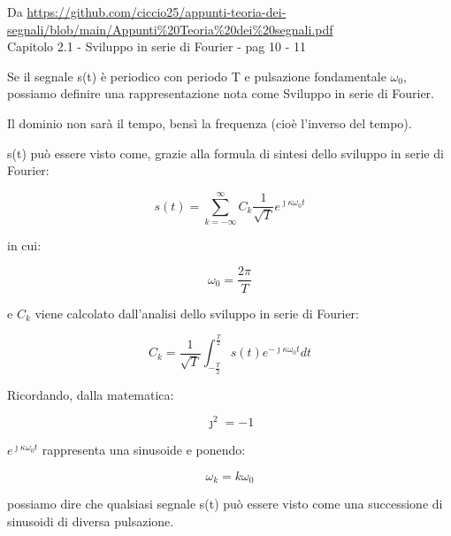 \begin{tcolorbox}
    Da \url{https://github.com/ciccio25/appunti-teoria-dei-segnali/blob/main/Appunti%20Teoria%20dei%20segnali.pdf} \\
    Capitolo 2.1 - Sviluppo in serie di Fourier - pag 10 - 11 \newline 

    Se il segnale s(t) è periodico con periodo T e pulsazione fondamentale $\omega_0$, possiamo definire una rappresentazione 
nota come Sviluppo in serie di Fourier. \newline 

Il dominio non sarà il tempo, bensì la frequenza (cioè l'inverso del tempo). \newline 

s(t) può essere visto come, grazie alla formula di sintesi dello sviluppo in serie di Fourier: \newline

{
    \Large 
    \begin{equation}
        s(t) 
        = 
        \sum_{k = - \infty}^{\infty} 
        C_k \frac{1}{\sqrt{T}} e^{\jmath \kappa \omega_0 t}
    \end{equation}
}

in cui: \newline

{
    \Large 
    \begin{equation}
        \omega_0 = \frac{2 \pi}{T}
    \end{equation}
}

e $C_k$ viene calcolato dall'analisi dello sviluppo in serie di Fourier: \newline

{
    \Large 
    \begin{equation}
        C_k 
        =
        \frac{1}{\sqrt{T}} \int_{-\frac{T}{2}}^{\frac{T}{2}} 
        s(t) e^{- \jmath \kappa \omega_0 t} dt
    \end{equation}
}

Ricordando, dalla matematica: 

{
    \Large 
    \begin{equation}
        \jmath ^{2} = -1 
    \end{equation}
}


 $e^{\jmath \kappa \omega_0 t}$ rappresenta una sinusoide e ponendo: 

{
    \Large 
    \begin{equation}
        \omega_k = k \omega_0
    \end{equation}
}

possiamo dire che qualsiasi segnale s(t) può essere visto come una 
successione di sinusoidi di diversa pulsazione. \newline 

\end{tcolorbox}

